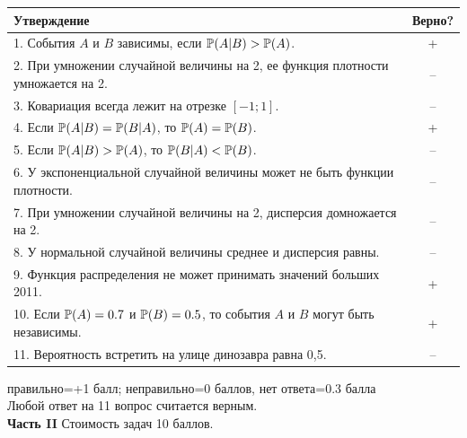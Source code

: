 \documentclass[12pt, a4paper]{article}\usepackage[]{graphicx}\usepackage[]{color}
\begin{document}
\begin{tabular}{|p{15cm}|c|}
\hline
Утверждение & Верно? \\
\hline
1. События $A$ и $B$ зависимы, если $\P(A|B)>\P(A)$.  &  + \\
\hline
2. При умножении случайной величины на 2, ее функция плотности умножается на 2. & -- \\
\hline
3. Ковариация всегда лежит на отрезке $[-1;1]$. &  -- \\
\hline
4. Если $\P(A|B)=\P(B|A)$, то $\P(A)=\P(B)$. & + \\
\hline
5. Если $\P(A|B)>\P(A)$, то $\P(B|A)<\P(B)$. & -- \\
\hline
6. У экспоненциальной случайной величины может не быть функции плотности. &  -- \\
\hline
7. При умножении случайной величины на 2, дисперсия домножается на 2. & -- \\
\hline
8. У нормальной случайной величины среднее и дисперсия равны. &  -- \\
\hline
9. Функция распределения не может принимать значений больших 2011. & + \\
\hline
10. Если $\P(A)=0.7$ и $\P(B)=0.5$, то события $A$ и $B$ могут быть независимы. & + \\
\hline
11. Вероятность встретить на улице динозавра равна 0{,}5. & -- \\
\hline
\end{tabular}

правильно=+1 балл; неправильно=0 баллов, нет ответа=0.3 балла \\
Любой ответ на 11 вопрос считается верным. \\

\textbf{Часть II} Стоимость задач 10 баллов. \\
\end{document}
